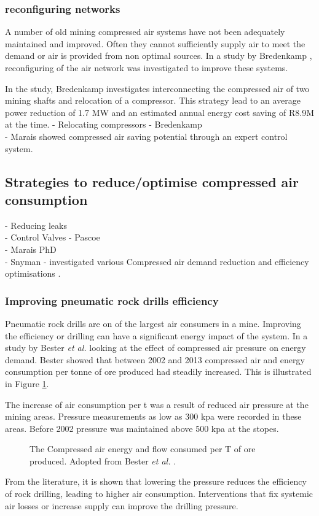 		\subsubsection{reconfiguring networks}
		A number of old mining compressed air systems  have not been adequately maintained and improved. Often they cannot sufficiently supply air to meet the demand or air is provided from non optimal sources. In a study by Bredenkamp \cite{Bredenkamp2013Masters}, reconfiguring of the air network was investigated to improve these systems.
		\par  
		In the study, Bredenkamp investigates interconnecting the compressed air of two mining shafts and relocation of a compressor. This strategy lead to an average power reduction of 1.7 MW and an estimated annual energy cost saving of R8.9M at the time.
		- Relocating compressors  - Bredenkamp\\
		- Marais showed compressed air saving potential through an expert control 	system.\cite{marais2010expert}\\
	\subsection{Strategies to reduce/optimise compressed air consumption}
		- Reducing leaks\\
		- Control Valves - Pascoe\\
		- Marais PhD\\
		- Snyman - investigated various Compressed air demand reduction and efficiency optimisations \cite{Snyman2011Masters}.
		\subsubsection{Improving pneumatic rock drills efficiency}
		 Pneumatic rock drills are on of the largest air consumers in a mine. Improving the efficiency or drilling can have a significant energy impact of the system. In a study by  Bester \textit{et al.} \cite{bester2013effect} looking at the effect of compressed air pressure on energy demand. Bester showed that between 2002 and 2013 compressed air and energy consumption per tonne of ore produced had steadily increased. This is illustrated  in Figure \ref{fig: Compressed energy and air flow per ton}. 
		 \par 
		 The increase of air consumption per \gls{t} was a result of reduced air pressure at the mining areas. Pressure measurements as low as 300 \gls{kpa} were recorded in these areas. Before 2002 pressure was maintained above 500 \gls{kpa} at the stopes. 
		 \par 
		 \begin{figure}[h]
		 	\centering
		 	
		 	\caption[The Compressed air energy and flow consumed per T of ore produced.]{The Compressed air energy and flow consumed per T of ore produced. Adopted from Bester \textit{et al.} \cite{bester2013effect}.}
		 	\label{fig: Compressed energy and air flow per ton}
		 \end{figure}
		 From the literature, it is shown that lowering the pressure reduces the efficiency of rock drilling, leading to higher air consumption. Interventions that fix systemic air losses or increase supply can improve the drilling pressure.
